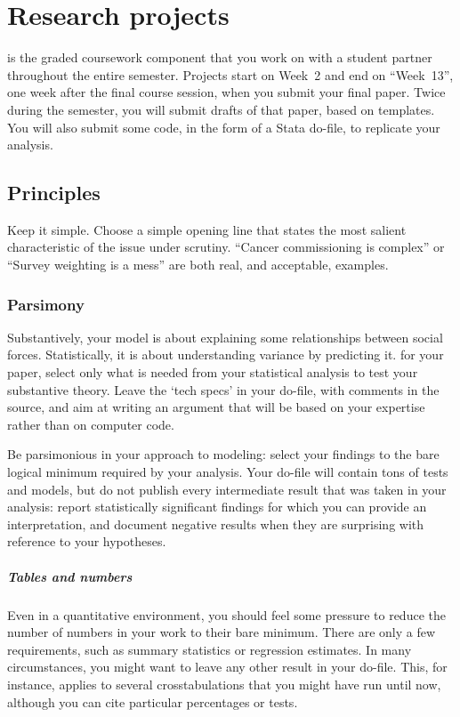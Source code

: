 \chapter{Research projects}%
	\label{ch:paper}

 is the graded coursework component that you work on with a student partner throughout the entire semester. Projects start on Week~2 and end on ``Week~13'', one week after the final course session, when you submit your final paper. Twice during the semester, you will submit drafts of that paper, based on templates. You will also submit some code, in the form of a Stata do-file, to replicate your analysis.



\section{Principles}

Keep it simple. Choose a simple opening line that states the most salient characteristic of the issue under scrutiny. ``Cancer commissioning is complex'' or ``Survey weighting is a mess'' are both real, and acceptable, examples.

\subsection{Parsimony}

Substantively, your model is about explaining some relationships between social forces. Statistically, it is about understanding variance by predicting it. for your paper, select only what is needed from your statistical analysis to test your substantive theory. Leave the `tech specs' in your do-file, with comments in the source, and aim at writing an argument that will be based on your expertise rather than on computer code.

Be parsimonious in your approach to modeling: select your findings to the bare logical minimum required by your analysis. Your do-file will contain tons of tests and models, but do not publish every intermediate result that was taken in your analysis: report statistically significant findings for which you can provide an interpretation, and document negative results when they are surprising with reference to your hypotheses.

\paragraph{Tables and numbers} Even in a quantitative environment, you should feel some pressure to reduce the number of numbers in your work to their bare minimum. There are only a few requirements, such as summary statistics or regression estimates. In many circumstances, you might want to leave any other result in your do-file. This, for instance, applies to several crosstabulations that you might have run until now, although you can cite particular percentages or tests.

